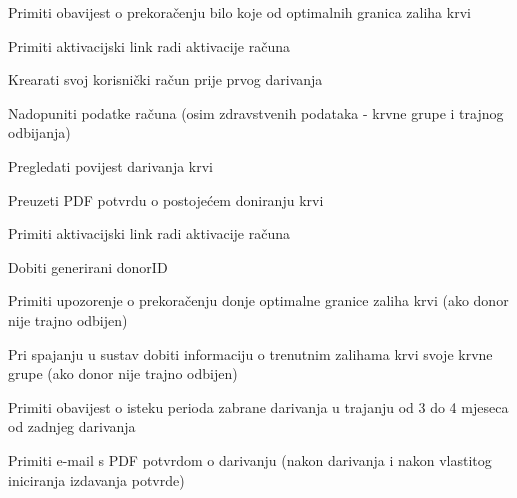 \begin{packed_enum}
\begin{packed_enum}
				\end{packed_enum}
				
				\item  {}
				
				\begin{packed_enum}
					
					\item Primiti obavijest o prekoračenju bilo koje od optimalnih granica zaliha krvi
					\item Primiti aktivacijski link radi aktivacije računa
					
				\end{packed_enum}
				
				\item  {}
				
				\begin{packed_enum}
					
					\item Krearati svoj korisnički račun prije prvog darivanja
					\item Nadopuniti podatke računa (osim zdravstvenih podataka - krvne grupe i trajnog odbijanja)
					\item Pregledati povijest darivanja krvi
					\item Preuzeti PDF potvrdu o postojećem doniranju krvi
					
				\end{packed_enum}
				
				
				\item  {}
				
				\begin{packed_enum}
					
					\item Primiti aktivacijski link radi aktivacije računa
					\item Dobiti generirani donorID
					\item Primiti upozorenje o prekoračenju donje optimalne granice zaliha krvi (ako donor nije trajno odbijen)
					\item Pri spajanju u sustav dobiti informaciju o trenutnim zalihama krvi svoje krvne grupe (ako donor nije trajno odbijen)
					\item Primiti obavijest o isteku perioda zabrane darivanja u trajanju od 3 do 4 mjeseca od zadnjeg darivanja
					\item Primiti e-mail s PDF potvrdom o darivanju (nakon darivanja i nakon vlastitog iniciranja izdavanja potvrde)
					

\end{packed_enum}
\end{packed_enum}
